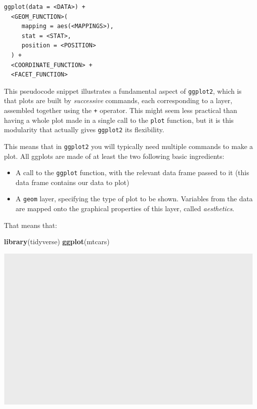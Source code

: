 \documentclass[]{book}
\newenvironment{Shaded}{}{}
\newcommand{\KeywordTok}[1]{\textcolor[rgb]{0.00,0.44,0.13}{\textbf{#1}}}
\newcommand{\NormalTok}[1]{#1}
\providecommand{\tightlist}{%
  \setlength{\itemsep}{0pt}\setlength{\parskip}{0pt}}
\begin{document}
\begin{verbatim}
ggplot(data = <DATA>) +
  <GEOM_FUNCTION>(
     mapping = aes(<MAPPINGS>),
     stat = <STAT>,
     position = <POSITION>
  ) +
  <COORDINATE_FUNCTION> +
  <FACET_FUNCTION>
\end{verbatim}

This pseudocode snippet illustrates a fundamental aspect of \texttt{ggplot2}, which is that plots are built by \emph{successive} commands, each corresponding to a layer, assembled together using the \texttt{+} operator. This might seem less practical than having a whole plot made in a single call to the \texttt{plot} function, but it is this modularity that actually gives \texttt{ggplot2} its flexibility.

This means that in \texttt{ggplot2} you will typically need multiple commands to make a plot. All ggplots are made of at least the two following basic ingredients:

\begin{itemize}
\tightlist
\item
  A call to the \texttt{ggplot} function, with the relevant data frame passed to it (this data frame contains our data to plot)
\item
  A \texttt{geom} layer, specifying the type of plot to be shown. Variables from the data are mapped onto the graphical properties of this layer, called \emph{aesthetics}.
\end{itemize}

That means that:

\begin{Shaded}
\begin{Highlighting}[]
\KeywordTok{library}\NormalTok{(tidyverse)}
\KeywordTok{ggplot}\NormalTok{(mtcars)}
\end{Highlighting}
\end{Shaded}

\begin{center}\includegraphics[width=\textwidth]{TRES-Tidy-Tutorial_files/figure-latex/unnamed-chunk-106-1} \end{center}
\end{document}
